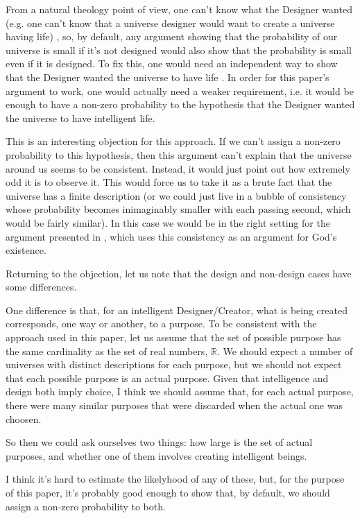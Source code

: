 \documentclass[a4paper
]{article}
\def\reale{\mathbb{R}}
\newcommand{\paper}[1]{paper}
\begin{document}
From a natural theology point of view, one can't
know what the Designer wanted
(e.g. one can't know that a universe designer would want to create
a universe having life) \parencites{Sober2009}{Narveson2003}, so, by default,
any argument showing that the probability of our universe is small
if it's not designed would also show that the probability is small
even if it is designed.
To fix this, one would need an independent way to show that the Designer
wanted the universe to have life \parencite{Sober2003}.
In order for this paper's argument to work, one would actually need a weaker
requirement, i.e. it would be enough to have a non-zero probability
to the hypothesis that the Designer wanted the universe to have intelligent
life.

This is an interesting objection for this approach.
If we can't assign a
non-zero probability to this hypothesis, then this argument can't explain
that the universe around us seems to be consistent.
Instead, it would just point out how extremely odd it is to observe it.
This would force us to take it as a brute fact that the universe has a
finite description (or we could just
live in a bubble of consistency whose probability becomes inimaginably
smaller with each passing second, which would be fairly similar).
In this case we would be in the right setting for the argument presented in
\cite{Swinburne2004}, which uses this consistency as an argument for God's
existence.

Returning to the objection, let us note that the design and non-design cases
have some differences.

One difference is that, for an intelligent Designer/Creator, what is being
created corresponds, one way or another, to a purpose.
To be consistent with
the approach used in this \paper{}, let us assume that the set of possible
purpose has the same cardinality as the set of real numbers, $\reale$.
We should expect a number of universes with
distinct descriptions for each purpose, but we should not expect that each
possible purpose is an actual purpose.
Given that intelligence and design
both imply choice, I think we should assume that, for each actual purpose,
there were many similar purposes that were discarded when the actual one
was choosen.

So then we could ask ourselves two things: how large is the set of actual
purposes, and whether one of them involves creating intelligent beings.

I think it's hard to estimate the likelyhood of any of these, but, for the
purpose of this \paper{}, it's probably good enough to show that, by default,
we should assign a non-zero probability to both.
\end{document}
